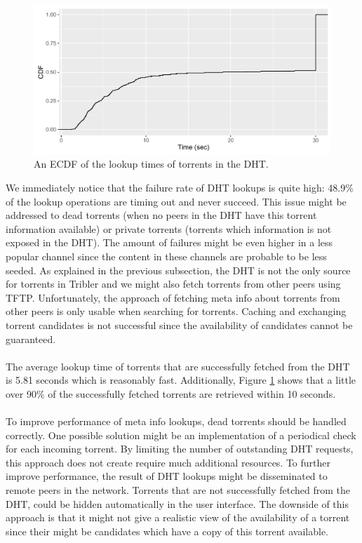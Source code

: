 \begin{figure}[!h]
	\centering
	\includegraphics[width=1.0\columnwidth]{images/experiments/metainfo_fetch}
	\caption{An ECDF of the lookup times of torrents in the DHT.}
	\label{fig:metainfo_fetch}
\end{figure}

We immediately notice that the failure rate of DHT lookups is quite high: 48.9\% of the lookup operations are timing out and never succeed. This issue might be addressed to dead torrents (when no peers in the DHT have this torrent information available) or private torrents (torrents which information is not exposed in the DHT). The amount of failures might be even higher in a less popular channel since the content in these channels are probable to be less seeded. As explained in the previous subsection, the DHT is not the only source for torrents in Tribler and we might also fetch torrents from other peers using TFTP. Unfortunately, the approach of fetching meta info about torrents from other peers is only usable when searching for torrents. Caching and exchanging torrent candidates is not successful since the availability of candidates cannot be guaranteed.\\\\
The average lookup time of torrents that are successfully fetched from the DHT is 5.81 seconds which is reasonably fast. Additionally, Figure \ref{fig:metainfo_fetch} shows that a little over 90\% of the successfully fetched torrents are retrieved within 10 seconds.\\\\
To improve performance of meta info lookups, dead torrents should be handled correctly. One possible solution might be an implementation of a periodical check for each incoming torrent. By limiting the number of outstanding DHT requests, this approach does not create require much additional resources. To further improve performance, the result of DHT lookups might be disseminated to remote peers in the network. Torrents that are not successfully fetched from the DHT, could be hidden automatically in the user interface. The downside of this approach is that it might not give a realistic view of the availability of a torrent since their might be candidates which have a copy of this torrent available.